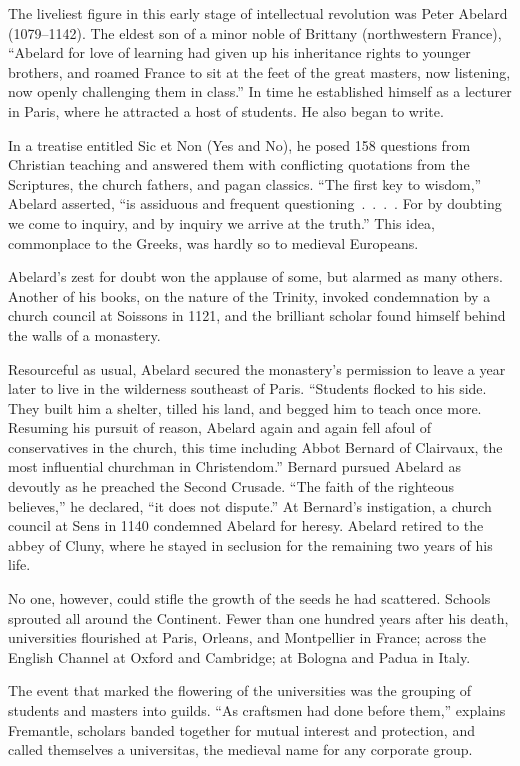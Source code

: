 The liveliest figure in this early stage of intellectual revolution was Peter Abelard (1079–1142).
The eldest son of a minor noble of Brittany (northwestern France), “Abelard for love of learning had
given up his inheritance rights to younger brothers, and roamed France to sit at the feet of the
great masters, now listening, now openly challenging them in class.” In time he established himself
as a lecturer in Paris, where he attracted a host of students. He also began to write.

In a treatise entitled Sic et Non (Yes and No), he posed 158 questions from Christian teaching and
answered them with conflicting quotations from the Scriptures, the church fathers, and pagan
classics. “The first key to wisdom,” Abelard asserted, “is assiduous and frequent
questioning~.~.~.~. For by doubting we come to inquiry, and by inquiry we arrive at the truth.” This
idea, commonplace to the Greeks, was hardly so to medieval Europeans.

Abelard’s zest for doubt won the applause of some, but alarmed as many others. Another of his books,
on the nature of the Trinity, invoked condemnation by a church council at Soissons in 1121, and the
brilliant scholar found himself behind the walls of a monastery.

Resourceful as usual, Abelard secured the monastery’s permission to leave a year later to live in
the wilderness southeast of Paris. “Students flocked to his side. They built him a shelter, tilled
his land, and begged him to teach once more. Resuming his pursuit of reason, Abelard again and again
fell afoul of conservatives in the church, this time including Abbot Bernard of Clairvaux, the most
influential churchman in Christendom.” Bernard pursued Abelard as devoutly as he preached the Second
Crusade. “The faith of the righteous believes,” he declared, “it does not dispute.” At Bernard’s
instigation, a church council at Sens in 1140 condemned Abelard for heresy. Abelard retired to the
abbey of Cluny, where he stayed in seclusion for the remaining two years of his life.

No one, however, could stifle the growth of the seeds he had scattered. Schools sprouted all around
the Continent. Fewer than one hundred years after his death, universities flourished at Paris,
Orleans, and Montpellier in France; across the English Channel at Oxford and Cambridge; at Bologna
and Padua in Italy.

The event that marked the flowering of the universities was the grouping of students and masters
into guilds. “As craftsmen had done before them,” explains Fremantle, scholars banded together for
mutual interest and protection, and called themselves a universitas, the medieval name for any
corporate group.


